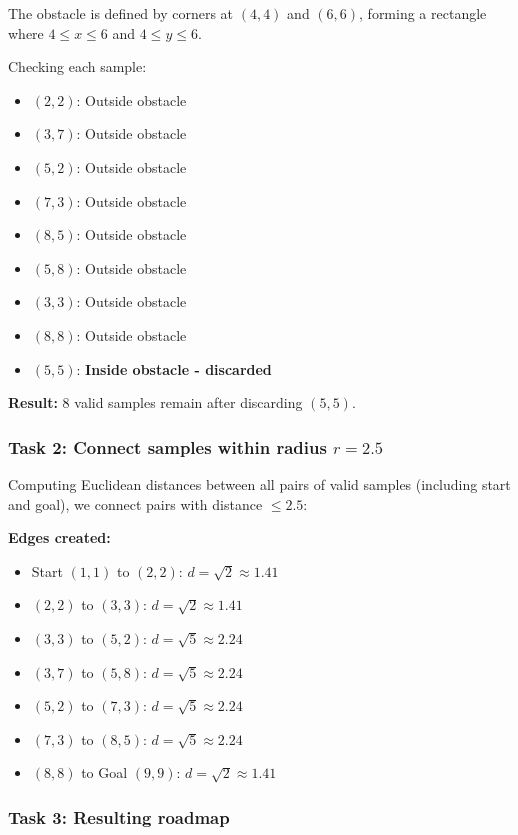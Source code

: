 \documentclass[11pt]{article}
\begin{document}
The obstacle is defined by corners at $(4,4)$ and $(6,6)$, forming a rectangle where $4 \leq x \leq 6$ and $4 \leq y \leq 6$.

Checking each sample:
\begin{itemize}
    \item $(2,2)$: Outside obstacle
    \item $(3,7)$: Outside obstacle
    \item $(5,2)$: Outside obstacle
    \item $(7,3)$: Outside obstacle
    \item $(8,5)$: Outside obstacle
    \item $(5,8)$: Outside obstacle
    \item $(3,3)$: Outside obstacle
    \item $(8,8)$: Outside obstacle
    \item $(5,5)$: \textbf{Inside obstacle - discarded}
\end{itemize}

\textbf{Result:} 8 valid samples remain after discarding $(5,5)$.

\subsubsection{Task 2: Connect samples within radius $r = 2.5$}

Computing Euclidean distances between all pairs of valid samples (including start and goal), we connect pairs with distance $\leq 2.5$:

\textbf{Edges created:}
\begin{itemize}
    \item Start $(1,1)$ to $(2,2)$: $d = \sqrt{2} \approx 1.41$
    \item $(2,2)$ to $(3,3)$: $d = \sqrt{2} \approx 1.41$
    \item $(3,3)$ to $(5,2)$: $d = \sqrt{5} \approx 2.24$
    \item $(3,7)$ to $(5,8)$: $d = \sqrt{5} \approx 2.24$
    \item $(5,2)$ to $(7,3)$: $d = \sqrt{5} \approx 2.24$
    \item $(7,3)$ to $(8,5)$: $d = \sqrt{5} \approx 2.24$
    \item $(8,8)$ to Goal $(9,9)$: $d = \sqrt{2} \approx 1.41$
\end{itemize}

\subsubsection{Task 3: Resulting roadmap}
\end{document}

